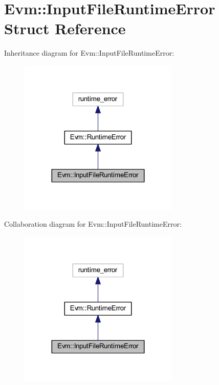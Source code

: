 \hypertarget{struct_evm_1_1_input_file_runtime_error}{}\section{Evm\+:\+:Input\+File\+Runtime\+Error Struct Reference}
\label{struct_evm_1_1_input_file_runtime_error}


Inheritance diagram for Evm\+:\+:Input\+File\+Runtime\+Error\+:
\nopagebreak
\begin{figure}[H]
\begin{center}
\leavevmode
\includegraphics[width=215pt]{struct_evm_1_1_input_file_runtime_error__inherit__graph}
\end{center}
\end{figure}


Collaboration diagram for Evm\+:\+:Input\+File\+Runtime\+Error\+:
\nopagebreak
\begin{figure}[H]
\begin{center}
\leavevmode
\includegraphics[width=215pt]{struct_evm_1_1_input_file_runtime_error__coll__graph}
\end{center}
\end{figure}
